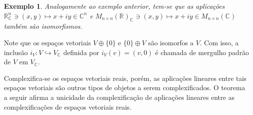 \documentclass[12pt]{book}
\newtheorem{exemplo}[teorema]{Exemplo}
\newcommand{\complexificacao}[1]{#1_{\complexo{}}}
\newcommand{\complexo}[1]{\mathbb{C}^{#1}}
\newcommand{\matrizquadcomplexa}[1]{M_{#1 \times #1}(\complexo{})}
\newcommand{\matrizquadreal}[1]{M_{#1 \times #1}(\real{})}
\newcommand{\real}[1]{\mathbb{R}^{#1}}
\begin{document}
	\begin{exemplo}\label{exemplo_complexificacao_matrizes}
		Analogamente ao exemplo anterior, tem-se que as aplicações $\complexificacao{\real{n}} \ni (x,y) \mapsto x+iy \in \complexo{n}$ e  $\complexificacao{\matrizquadreal{n}} \ni (x,y) \mapsto x+iy \in \matrizquadcomplexa{n}$ também são isomorfismos.
	\end{exemplo}
	
	Note que os espaços vetoriais $V\oplus\{0\}$ e $\{0\}\oplus V$ são isomorfos a $V$. Com isso, a inclusão $i_{V} :V \hookrightarrow \complexificacao{V}$ definida por $i_{V}(v) = (v, 0)$ é chamada de mergulho padrão de $V$ em $\complexificacao{V}$.
	
	Complexifica-se os espaços vetoriais reais, porém, as aplicações lineares entre tais espaços vetoriais são outros tipos de objetos a serem complexificados. O teorema a seguir afirma a unicidade da complexificação de aplicações lineares entre as complexificações de espaços vetoriais reais.
	
\end{document}
